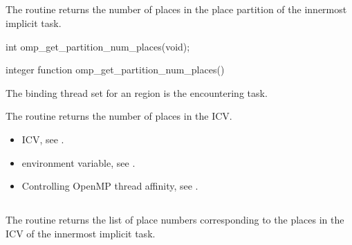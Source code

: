 \subsection{}
\label{subsec:omp_get_partition_num_places}

\summary
The  routine returns the number of places in the place partition of the innermost implicit task.

\format
\ccppspecificstart
\begin{boxedcode}
int omp\_get\_partition\_num\_places(void);
\end{boxedcode}
\ccppspecificend

\fortranspecificstart
\begin{boxedcode}
integer function omp\_get\_partition\_num\_places()
\end{boxedcode}
\fortranspecificend

\binding
The binding thread set for an   region is the encountering task.

\effect
The  routine returns the number of places in the  ICV.

\crossreferences
\begin{itemize}
\item {} ICV, see 
.

\item {} environment variable, see 
.

\item Controlling OpenMP thread affinity, see 
. 
\end{itemize}





\subsection{}
\label{subsec:omp_get_partition_place_nums}

\summary
The  routine returns the list of place numbers corresponding to the places in the  ICV of the innermost implicit task.

